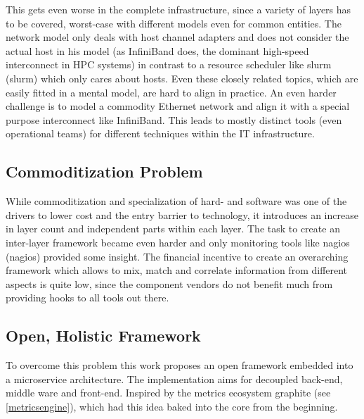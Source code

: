 This gets even worse in the complete infrastructure, since a variety of layers has to be covered, worst-case with different models even for common entities.
The network model only deals with host channel adapters and does not consider the actual host in his model (as InfiniBand does, the dominant high-speed interconnect in HPC systems) in contrast to a resource
scheduler like \gls{slurm} (\glsdesc{slurm}) which only cares about hosts. Even these closely related topics, which are easily fitted
in a mental model, are hard to align in practice. An even harder challenge is to model a commodity Ethernet network and align it with a special purpose interconnect like InfiniBand.
This leads to mostly distinct tools (even operational teams) for different techniques within the IT infrastructure.

\subsection{Commoditization Problem}
While commoditization and specialization of hard- and software was one of the drivers to lower cost and the entry barrier to technology, it
introduces an increase in layer count and
independent parts within each layer. The task to create an inter-layer framework became even harder and only monitoring tools like \gls{nagios} (\glsdesc{nagios}) provided some insight.
The financial incentive to create an overarching framework which allows to mix, match and correlate information from different aspects is quite low, since the component vendors
do not benefit much from providing hooks to all tools out there.

\subsection{Open, Holistic Framework}
To overcome this problem this work proposes an open framework embedded into a microservice architecture. The implementation aims for decoupled back-end, middle ware and front-end.
Inspired by the metrics ecosystem \gls{graphite} (see \ref{metricsengine}), which had this idea baked into the core from the beginning.

